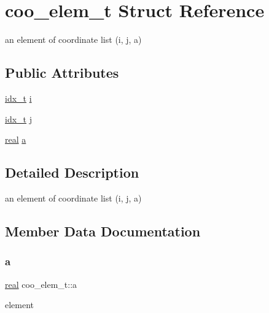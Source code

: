 \hypertarget{structcoo__elem__t}{}\section{coo\+\_\+elem\+\_\+t Struct Reference}
\label{structcoo__elem__t}


an element of coordinate list (i, j, a)  


\subsection*{Public Attributes}
\begin{DoxyCompactItemize}
\item 
\hyperlink{spmv_8cc_a8e93478a00e685bea5e6a3f617bf03a3}{idx\+\_\+t} \hyperlink{structcoo__elem__t_a4bba7fd2cc28e3a6dd2eea0fed6b5a06}{i}
\item 
\hyperlink{spmv_8cc_a8e93478a00e685bea5e6a3f617bf03a3}{idx\+\_\+t} \hyperlink{structcoo__elem__t_a45a4cd1c7ffe70ddd75dff7c764bbfc6}{j}
\item 
\hyperlink{spmv_8cc_a11d147c64891830c9e79b3315b1b2e21}{real} \hyperlink{structcoo__elem__t_ad835f42450aaf40546d685fdfe1f9fcf}{a}
\end{DoxyCompactItemize}


\subsection{Detailed Description}
an element of coordinate list (i, j, a) 

\subsection{Member Data Documentation}
\mbox{\label{structcoo__elem__t_ad835f42450aaf40546d685fdfe1f9fcf}} 
\subsubsection{\texorpdfstring{a}{a}}
{\footnotesize\ttfamily \hyperlink{spmv_8cc_a11d147c64891830c9e79b3315b1b2e21}{real} coo\+\_\+elem\+\_\+t\+::a}

element \mbox{\label{structcoo__elem__t_a4bba7fd2cc28e3a6dd2eea0fed6b5a06}} 
